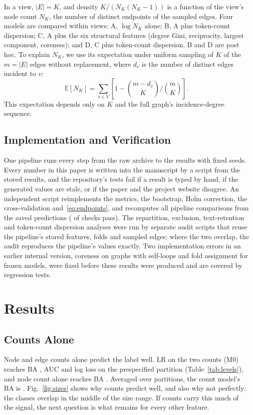 \documentclass[conference]{IEEEtran}
\newcommand{\NK}{N_K}
\begin{document}
In a view, $|E|=K$, and density $K/(\NK(\NK-1))$ is a function of the view's node count $\NK$, the number of distinct endpoints of the sampled edges. Four models are compared within views: A, $\log\NK$ alone; B, A plus token-count dispersion; C, A plus the six structural features (degree Gini, reciprocity, largest component, coreness); and D, C plus token-count dispersion. B and D are post hoc. To explain $\NK$, we use its expectation under uniform sampling of $K$ of the $m=|E|$ edges without replacement, where $d_v$ is the number of distinct edges incident to $v$:
\begin{equation}
\mathbb{E}[\NK]=\sum_{v\in V}\left[1-\binom{m-d_v}{K}\Big/\binom{m}{K}\right].
\label{eq:endpoints}
\end{equation}
This expectation depends only on $K$ and the full graph's incidence-degree sequence.

\subsection{Implementation and Verification}
One pipeline runs every step from the raw archive to the results with fixed seeds. Every number in this paper is written into the manuscript by a script from the stored results, and the repository's tests fail if a result is typed by hand, if the generated values are stale, or if the paper and the project website disagree. An independent script reimplements the metrics, the bootstrap, Holm correction, the cross-validation and~\eqref{eq:endpoints}, and recomputes all pipeline comparisons from the saved predictions (\RChecksPassed{} of \RChecksTotal{} checks pass). The repartition, exclusion, text-retention and token-count dispersion analyses were run by separate audit scripts that reuse the pipeline's stored features, folds and sampled edges; where the two overlap, the audit reproduces the pipeline's values exactly. Two implementation errors in an earlier internal version, coreness on graphs with self-loops and fold assignment for frozen models, were fixed before these results were produced and are covered by regression tests.

\section{Results}\label{sec:results}
\subsection{Counts Alone}\label{sec:counts}
Node and edge counts alone predict the label well. LR on the two counts (M0) reaches BA \RCountsBA, AUC \RCountsAUC{} and log loss \RCountsLL{} on the prespecified partition (Table~\ref{tab:levels}), and node count alone reaches BA \RNodeOnlyBA. Averaged over \RNPartitions{} partitions, the count model's BA is \RTwCountsBA. Fig.~\ref{fig:sizes} shows why counts predict well, and also why not perfectly: the classes overlap in the middle of the size range. If counts carry this much of the signal, the next question is what remains for every other feature.
\end{document}
